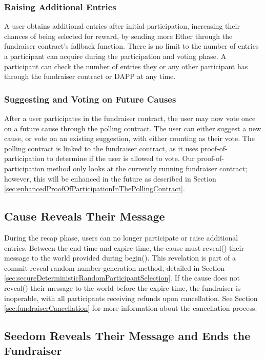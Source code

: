 \documentclass[11pt]{article}
\begin{document}
\subsubsection{Raising Additional Entries}

A user obtains additional entries after initial participation, increasing their chances of being selected for reward, by sending more Ether through the fundraiser contract's fallback function. There is no limit to the number of entries a participant can acquire during the participation and voting phase. A participant can check the number of entries they or any other participant has through the fundraiser contract or DAPP at any time.

\subsubsection{Suggesting and Voting on Future Causes}

After a user participates in the fundraiser contract, the user may now vote once on a future cause through the polling contract. The user can either suggest a new cause, or vote on an existing suggestion, with either counting as their vote. The polling contract is linked to the fundraiser contract, as it uses proof-of-participation to determine if the user is allowed to vote. Our proof-of-participation method only looks at the currently running fundraiser contract; however, this will be enhanced in the future as described in Section \ref{sec:enhancedProofOfParticipationInThePollingContract}.

\subsection{Cause Reveals Their Message}

During the recap phase, users can no longer participate or raise additional entries. Between the end time and expire time, the cause must reveal() their message to the world provided during begin(). This revelation is part of a commit-reveal random number generation method, detailed in Section \ref{sec:secureDeterministicRandomParticipantSelection}. If the cause does not reveal() their message to the world before the expire time, the fundraiser is inoperable, with all participants receiving refunds upon cancellation. See Section \ref{sec:fundraiserCancellation} for more information about the cancellation process.

\subsection{Seedom Reveals Their Message and Ends the Fundraiser}
\label{sec:seedomRevealsTheirMessageAndEndsTheFundraiser}
\end{document}
